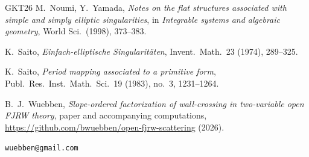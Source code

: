 \documentclass[11pt]{amsart}
\theoremstyle{definition}
\theoremstyle{remark}
\begin{document}
\begin{thebibliography}{GKT26}
 M.~Noumi, Y.~Yamada,
\emph{Notes on the flat structures associated with simple and simply elliptic
singularities}, in \emph{Integrable systems and algebraic geometry}, World Sci.\
(1998), 373--383.

 K.~Saito,
\emph{Einfach-elliptische Singularit\"aten},
Invent.\ Math.\ 23 (1974), 289--325.

 K.~Saito,
\emph{Period mapping associated to a primitive form},
Publ.\ Res.\ Inst.\ Math.\ Sci.\ 19 (1983), no.~3, 1231--1264.

 B.~J.~Wuebben,
\emph{Slope-ordered factorization of wall-crossing in two-variable open FJRW
theory},
paper and accompanying computations,
\url{https://github.com/bwuebben/open-fjrw-scattering} (2026).

\end{thebibliography}

\bigskip
{} \texttt{wuebben@gmail.com}
\end{document}
